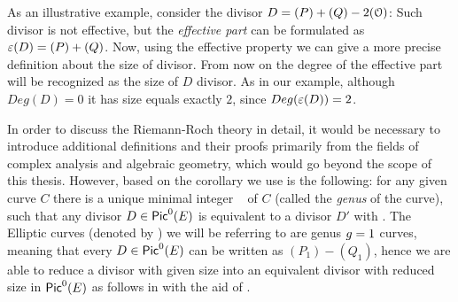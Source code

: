 As an illustrative example, consider the divisor $D = (P) + (Q) - 2 (\mathFormulaEllipticCurvePointAtInfinity)$: Such divisor is not effective, but the \textit{effective part} can be formulated as  $\mathFormulaEffectivePartOfDivisor{D} = (P) + (Q)$. Now, using the effective property we can give a more precise definition about the size of divisor. From now on the degree of the effective part will be recognized as the size of $D$ divisor. As in our example, although $Deg(D) = 0$ it has size equals exactly $2$,  since $Deg(\mathFormulaEffectivePartOfDivisor{D})=2$.

In order to discuss the Riemann-Roch theory in detail, it would be necessary to introduce additional definitions and their proofs primarily from the fields of complex analysis and algebraic geometry, which would go beyond the scope of this thesis. However, based on \cite{theory.pairings.for.beginners}  
the corollary we use is the following: for any given curve $C$ there is a unique minimal integer \mathFormulaGenus~ of $C$ (called the \textit{genus} of the curve), such that any divisor 
$D \in \mathFormulaPicardGroupWithIndexPar{E}{0}$ is
equivalent to a divisor $D'$ with . The Elliptic curves (denoted by ) we will be referring to are genus $\mathFormulaGenus = 1$ curves,  meaning that every $D \in \mathFormulaPicardGroupWithIndexPar{E}{0}$ can be written as $(P_1) - (Q_1)$, hence we are able to reduce a divisor with given size into an equivalent divisor with reduced size in $\mathFormulaPicardGroupWithIndexPar{E}{0}$ as follows in  with the aid of .

